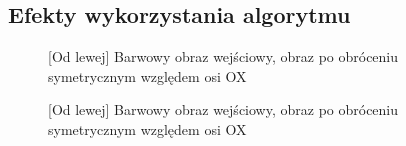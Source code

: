 \documentclass[a4paper,12pt, titlepage]{report}
\begin{document}
\subsection*{Efekty wykorzystania algorytmu}
\begin{figure}[h]
    \centering
    \caption{[Od lewej] Barwowy obraz wejściowy, obraz po obróceniu symetrycznym względem osi OX}%
    \label{fig:geo_after_grey1}%
\end{figure}
\FloatBarrier
\begin{figure}[h]
    \centering
    \caption{[Od lewej] Barwowy obraz wejściowy, obraz po obróceniu symetrycznym względem osi OX}%
    \label{fig:geo_after_grey1}%
\end{figure}
\FloatBarrier
\end{document}

